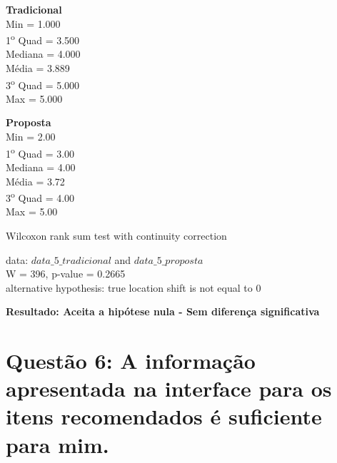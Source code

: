 \begin{multicols}{2}

\noindent\textbf{Tradicional}\\
Min = 1.000\\
1\textsuperscript{o} Quad = 3.500\\
Mediana = 4.000\\
Média = 3.889\\
3\textsuperscript{o} Quad = 5.000\\
Max = 5.000\\
\columnbreak

\noindent\textbf{Proposta}\\
Min = 2.00\\
1\textsuperscript{o} Quad = 3.00\\
Mediana = 4.00\\
Média = 3.72\\
3\textsuperscript{o} Quad = 4.00\\
Max = 5.00
\end{multicols}

Wilcoxon rank sum test with continuity correction

\noindent
data:  $data\_5\_tradicional$ and $data\_5\_proposta$\\
W = 396, p-value = 0.2665\\
alternative hypothesis: true location shift is not equal to 0

\noindent
\textbf{Resultado: Aceita a hipótese nula - Sem diferença significativa}

\newpage
\section{Questão 6: A informação apresentada na interface para os itens recomendados é suficiente para mim.}

